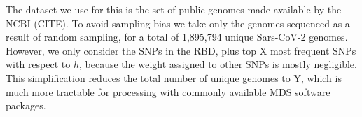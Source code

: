 \documentclass{article}
\begin{document}
The dataset we use for this is the set of public genomes made available by the NCBI (CITE). 
To avoid sampling bias we take only the genomes sequenced as a result of random sampling, for a total of 1,895,794 unique Sars-CoV-2 genomes.
However, we only consider the SNPs in the RBD, plus top X most frequent SNPs with respect to $h$, because the weight assigned to other SNPs is mostly negligible. 
This simplification reduces the total number of unique genomes to Y, which is much more tractable for processing with commonly available MDS software packages. 








\end{document}
